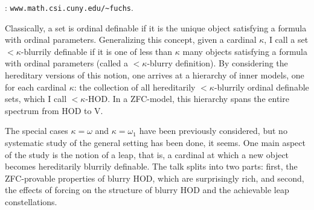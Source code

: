 \documentclass[bsl,meeting]{asl}
\def\urladdr#1{\endgraf\noindent{\it URL Address}: {\tt #1}.}
\newcommand{\NP}{}
\begin{document}
\thispagestyle{empty}


\NP%
%
%
%
%
\urladdr{www.math.csi.cuny.edu/\textasciitilde fuchs}


Classically, a set is ordinal definable if it is the unique object satisfying a formula with ordinal parameters. Generalizing this concept, given a cardinal $\kappa$, I call a set ${<}\kappa$-blurrily definable if it is one of less than $\kappa$ many objects satisfying a formula with ordinal parameters (called a ${<}\kappa$-blurry definition). By considering the hereditary versions of this notion, one arrives at a hierarchy of inner models, one for each cardinal $\kappa$: the collection of all hereditarily ${<}\kappa$-blurrily ordinal definable sets, which I call ${<}\kappa$-HOD. In a ZFC-model, this hierarchy spans the entire spectrum from HOD to V. 

The special cases $\kappa=\omega$ and $\kappa=\omega_1$ have been previously considered, but no systematic study of the general setting has been done, it seems. One main aspect of the study is the notion of a leap, that is, a cardinal at which a new object becomes hereditarily blurrily definable. The talk splits into two parts: first, the ZFC-provable properties of blurry HOD, which are surprisingly rich, and second, the effects of forcing on the structure of blurry HOD and the achievable leap constellations.
\end{document}
